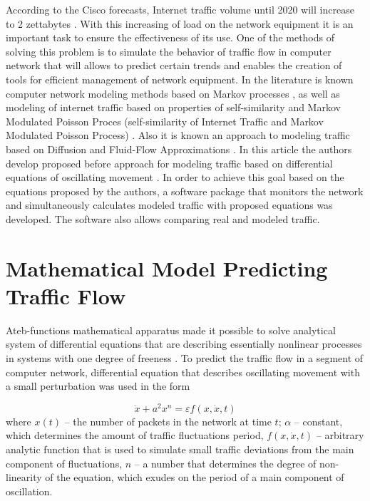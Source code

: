\documentclass[runningheads,a4paper]{llncs}
\begin{document}
According to the Cisco forecasts, Internet traffic volume until 2020 will increase to 2 zettabytes \cite{1}. With this increasing of load on the network equipment it is an important task to ensure the effectiveness of its use. One of the methods of solving this problem is to simulate the behavior of traffic flow in computer network that will allows to predict certain trends and enables the creation of tools for efficient management of  network equipment. In the literature is known computer network modeling methods  based on Markov processes \cite{2}, as well as modeling of internet traffic based on properties of self-similarity and Markov Modulated Poisson Proces (self-similarity of Internet Traffic and Markov Modulated Poisson Process) \cite{3}. Also it is known an approach to modeling traffic based on Diffusion and Fluid-Flow Approximations \cite{4}. In this article the authors develop proposed before approach for modeling traffic based on differential equations of oscillating movement \cite{5}. In order to achieve this goal based on the equations proposed by the authors, a software package that monitors the network and simultaneously calculates modeled traffic  with proposed equations was developed. The software also allows comparing real and modeled traffic.

\section{Mathematical Model Predicting Traffic Flow}

Ateb-functions mathematical apparatus made it possible to solve analytical system of differential equations that are describing essentially nonlinear processes in systems with one degree of freeness \cite{6}. To predict the traffic flow in a segment of computer network, differential equation that describes oscillating movement with a small perturbation was used in the form

\begin{equation} \label{eq:1}
\ddot{x} + a^2 x^n = \varepsilon f (x, \dot{x}, t)
\end{equation}
where $x(t)$ -- the number of packets in the network at time $t$; $\alpha$ -- constant, which determines the amount of traffic fluctuations period, $f (x, \dot{x}, t)$ -- arbitrary analytic function that is used to simulate small traffic deviations from the main component of  fluctuations, $n$ -- a number that determines the degree of non-linearity of the equation, which exudes on the period of a main component of oscillation. 
\end{document}

